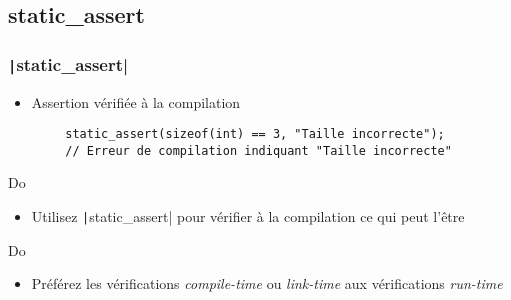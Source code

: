 \documentclass[C++.tex]{subfiles}
\begin{document}
\subsection*{static\_assert}
\begin{frame}[fragile]
	\frametitle{\texttt|static_assert|}
	\begin{itemize}
		\item Assertion vérifiée à la compilation
	\end{itemize}

	\begin{verbatim}
		static_assert(sizeof(int) == 3, "Taille incorrecte");
		// Erreur de compilation indiquant "Taille incorrecte"
	\end{verbatim}

	\begin{exampleblock}{Do}
		\begin{itemize}
			\item Utilisez \texttt|static_assert| pour vérifier à la compilation ce qui peut l'être
		\end{itemize}
	\end{exampleblock}

	\begin{exampleblock}{Do}
		\begin{itemize}
			\item Préférez les vérifications \textit{compile-time} ou \textit{link-time} aux vérifications \textit{run-time}
		\end{itemize}

	\end{exampleblock}


\end{frame}
\end{document}
